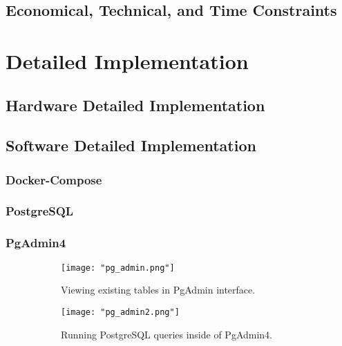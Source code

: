 \documentclass{article}
\begin{document}
\subsection{Economical, Technical, and Time Constraints}  

\section{Detailed Implementation} 

\subsection{Hardware Detailed Implementation}

\subsection{Software Detailed Implementation}
\subsubsection{Docker-Compose}
\subsubsection{PostgreSQL}
\subsubsection{PgAdmin4}
\begin{figure}[h!]
    \centering
    \begin{subfigure}[b]{.45\textwidth}
        \centering
        \texttt{[image: "pg\_admin.png"]}
        \caption{Viewing existing tables in PgAdmin interface.}
        \label{fig:pg_admin_tables}
    \end{subfigure}
    \begin{subfigure}[b]{.45\textwidth}
        \centering
        \texttt{[image: "pg\_admin2.png"]}
        \caption{Running PostgreSQL queries inside of PgAdmin4.}
        \label{fig:pg_admin_queries}
    \end{subfigure}
    \caption{}
    \label{fig:pg_admin_figs}
\end{figure}
\end{document}
